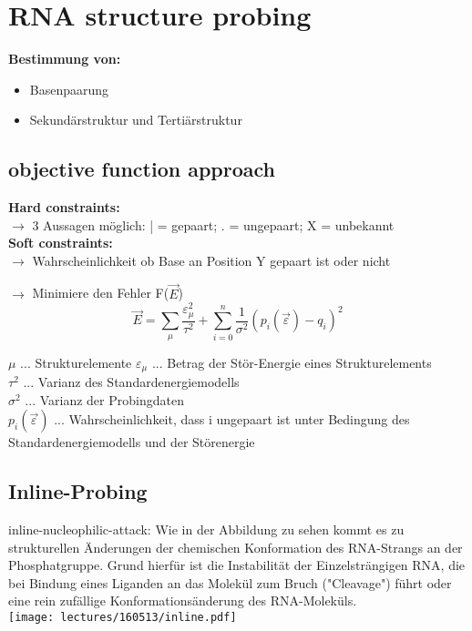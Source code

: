 \section{RNA structure probing}
\textbf{Bestimmung von:}
\begin{itemize}
\item Basenpaarung
\item Sekundärstruktur und Tertiärstruktur
\end{itemize}

\subsection{objective function approach}
\textbf{Hard constraints:} \\
$\rightarrow$ 3 Aussagen möglich: | = gepaart; . = ungepaart; X = unbekannt \\
\textbf{Soft constraints:} \\ 
$\rightarrow$ Wahrscheinlichkeit ob Base an Position Y gepaart ist oder nicht 

$\rightarrow$ Minimiere den Fehler F($\vec{E}$) \\
\begin{equation}
\vec{E} = \sum_{\mu} \dfrac{\varepsilon_{\mu}^{2}}{\tau^2} + \sum_{i = 0}^{n} \dfrac{1}{\sigma^2}(p_i(\vec{\varepsilon}) -q_i)^2
\end{equation} 

$\mu$ ... Strukturelemente
$\varepsilon_{\mu}$ ... Betrag der Stör-Energie eines Strukturelements\\
$\tau^2$ ... Varianz des Standardenergiemodells \\
$\sigma^2$ ... Varianz der Probingdaten \\
$p_i(\vec{\varepsilon})$ ... Wahrscheinlichkeit, dass i ungepaart ist unter Bedingung des Standardenergiemodells und der Störenergie

\subsection{Inline-Probing}
inline-nucleophilic-attack: Wie in der Abbildung zu sehen kommt es zu strukturellen Änderungen der chemischen Konformation des RNA-Strangs an der Phosphatgruppe. Grund hierfür ist die Instabilität der Einzelsträngigen RNA, die bei Bindung eines Liganden an das Molekül zum Bruch ("Cleavage") führt oder eine rein zufällige Konformationsänderung des RNA-Moleküls. \\
\texttt{[image: lectures/160513/inline.pdf]}

